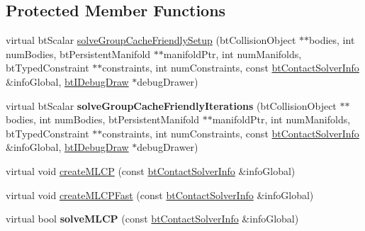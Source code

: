 \subsection*{Protected Member Functions}
\begin{DoxyCompactItemize}
\item 
virtual bt\+Scalar \hyperlink{classbt_m_l_c_p_solver_aa465e167537eceb89f7125d3bb2d5321}{solve\+Group\+Cache\+Friendly\+Setup} (bt\+Collision\+Object $\ast$$\ast$bodies, int num\+Bodies, bt\+Persistent\+Manifold $\ast$$\ast$manifold\+Ptr, int num\+Manifolds, bt\+Typed\+Constraint $\ast$$\ast$constraints, int num\+Constraints, const \hyperlink{structbt_contact_solver_info}{bt\+Contact\+Solver\+Info} \&info\+Global, \hyperlink{classbt_i_debug_draw}{bt\+I\+Debug\+Draw} $\ast$debug\+Drawer)
\item 
\hypertarget{classbt_m_l_c_p_solver_aba47abca0dc7f203f6ec5bc17d2f96a3}{virtual bt\+Scalar {\bfseries solve\+Group\+Cache\+Friendly\+Iterations} (bt\+Collision\+Object $\ast$$\ast$bodies, int num\+Bodies, bt\+Persistent\+Manifold $\ast$$\ast$manifold\+Ptr, int num\+Manifolds, bt\+Typed\+Constraint $\ast$$\ast$constraints, int num\+Constraints, const \hyperlink{structbt_contact_solver_info}{bt\+Contact\+Solver\+Info} \&info\+Global, \hyperlink{classbt_i_debug_draw}{bt\+I\+Debug\+Draw} $\ast$debug\+Drawer)}\label{classbt_m_l_c_p_solver_aba47abca0dc7f203f6ec5bc17d2f96a3}

\item 
virtual void \hyperlink{classbt_m_l_c_p_solver_a83c6bc90a6a311204fccec04aa331aee}{create\+M\+L\+C\+P} (const \hyperlink{structbt_contact_solver_info}{bt\+Contact\+Solver\+Info} \&info\+Global)
\item 
virtual void \hyperlink{classbt_m_l_c_p_solver_ab36b9b3bf2bbbd1de7db27ba109e0a8a}{create\+M\+L\+C\+P\+Fast} (const \hyperlink{structbt_contact_solver_info}{bt\+Contact\+Solver\+Info} \&info\+Global)
\item 
\hypertarget{classbt_m_l_c_p_solver_a8b3955c50047184e0deb904242a66941}{virtual bool {\bfseries solve\+M\+L\+C\+P} (const \hyperlink{structbt_contact_solver_info}{bt\+Contact\+Solver\+Info} \&info\+Global)}\label{classbt_m_l_c_p_solver_a8b3955c50047184e0deb904242a66941}

\end{DoxyCompactItemize}

